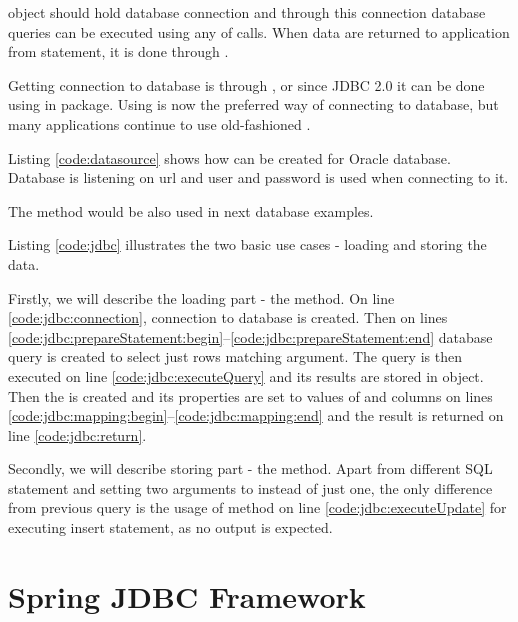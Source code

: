  object should hold database connection and through this connection
database queries can be executed using any of  calls.
When data are returned to application from statement, it is done through .

Getting connection to database is through , or since JDBC 2.0
it can be done using  in  package.
Using  is now the preferred way of connecting to database,
but many applications continue to use old-fashioned .

Listing \ref{code:datasource} shows how  can be created for Oracle database.
Database is listening on url 
and  user and  password is used when connecting to it.

The  method would be also used in next database examples.


Listing \ref{code:jdbc} illustrates the two basic use cases - loading and storing the data.

Firstly, we will describe the loading part - the  method.
On line \ref{code:jdbc:connection}, connection to database is created.
Then on lines \ref{code:jdbc:prepareStatement:begin}--\ref{code:jdbc:prepareStatement:end}
database query is created to select just rows matching  argument.
The query is then executed on line \ref{code:jdbc:executeQuery} and its results are stored
in  object. Then the  is created and its properties are
set to values of  and  columns on lines
\ref{code:jdbc:mapping:begin}--\ref{code:jdbc:mapping:end} and the result is returned on line \ref{code:jdbc:return}.

Secondly, we will describe storing part - the  method.
Apart from different SQL statement and setting two arguments to  instead of just one,
the only difference  from previous query is the usage of  method
on line \ref{code:jdbc:executeUpdate} for executing insert statement, as no output is expected.





\section{Spring JDBC Framework \label{frameworks:jdbcTemplate}}

